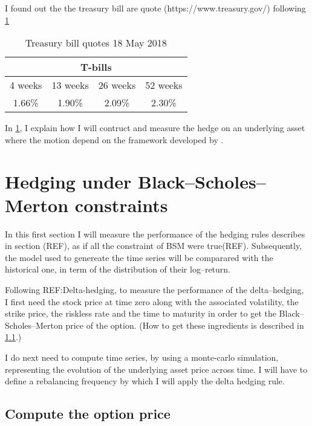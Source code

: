 \documentclass[12pt]{report}
\newcommand{\BSM}{Black--Scholes--Merton }
\begin{document}
I found out the the treasury bill are quote (https://www.treasury.gov/) following \cref{tab:methodology:Tbill}

\begin{table}[ht]
\centering
\begin{tabular}{cccc}
  \hline
  \multicolumn{4}{c}{T-bills} \\
  \hline
  4 weeks & 13 weeks & 26 weeks & 52 weeks \\
  1.66\% & 1.90\% & 2.09\% & 2.30\% \\
  \hline
\end{tabular}
\caption{Treasury bill quotes 18 May 2018} 
\label{tab:methodology:Tbill}
\end{table}


In \cref{sec:methodology:hedgingbsm}, I explain how I will contruct and measure the hedge on an underlying asset where the motion depend on the framework developed by \cite{bs}.

\section{Hedging under Black--Scholes--Merton constraints}
\label{sec:methodology:hedgingbsm}

In this first section I will measure the performance of the hedging rules describes in section (REF), as if all the constraint of BSM were true(REF).
Subsequently, the model used to genereate the time series will be comparared with the historical one, in term of the distribution of their log--return. 

Following REF:Delta-hedging, to measure the performance of the delta--hedging, I first need the stock price at time zero along with the associated volatility, the strike price, the riskless rate and the time to maturity in order to get the \BSM price of the option. (How to get these ingredients is described in \cref{sub:methodology:hedgingbsm:compute}.)

I do next need to compute time series, by using a monte-carlo simulation, representing the evolution of the underlying asset price across time. I will have to define a rebalancing frequency by which I will apply the delta hedging rule.


\subsection{Compute the option price}
\label{sub:methodology:hedgingbsm:compute}
\end{document}
